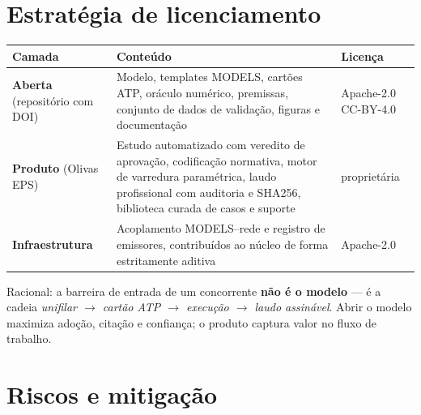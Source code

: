 \documentclass[12pt,a4paper]{article}
\begin{document}
\section{Estratégia de licenciamento}

\begin{center}
\small
\begin{tabularx}{\textwidth}{@{}p{2.9cm}Xp{2.6cm}@{}}
\toprule
\textbf{Camada} & \textbf{Conteúdo} & \textbf{Licença} \\
\midrule
\textbf{Aberta} \newline (repositório com DOI) &
Modelo, templates MODELS, cartões ATP, oráculo numérico, premissas, conjunto de dados de validação,
figuras e documentação &
Apache-2.0 \newline CC-BY-4.0 \\
\textbf{Produto} \newline (Olivas EPS) &
Estudo automatizado com veredito de aprovação, codificação normativa, motor de varredura
paramétrica, laudo profissional com auditoria e SHA256, biblioteca curada de casos e suporte &
proprietária \\
\textbf{Infraestrutura} &
Acoplamento MODELS--rede e registro de emissores, contribuídos ao núcleo de forma estritamente
aditiva &
Apache-2.0 \\
\bottomrule
\end{tabularx}
\end{center}

Racional: a barreira de entrada de um concorrente \textbf{não é o modelo} --- é a cadeia
\emph{unifilar $\rightarrow$ cartão ATP $\rightarrow$ execução $\rightarrow$ laudo assinável}. Abrir o
modelo maximiza adoção, citação e confiança; o produto captura valor no fluxo de trabalho.

\section{Riscos e mitigação}
\end{document}
